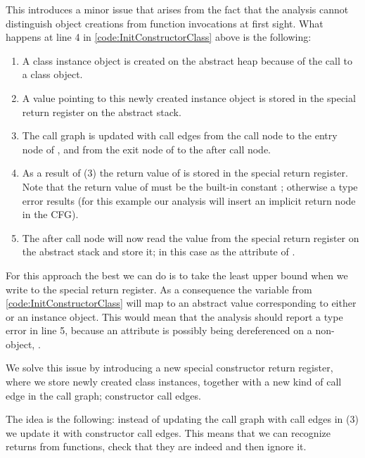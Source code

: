 This introduces a minor issue that arises from the fact that the analysis cannot distinguish object creations from function invocations at first sight. What happens at line 4 in \autoref{code:InitConstructorClass} above is the following:

\begin{enumerate}
	\item A class instance object is created on the abstract heap because of the call to a class object.
	\item A value pointing to this newly created instance object is stored in the special return register on the abstract stack.
	\item The call graph is updated with call edges from the call node to the entry node of , and from the exit node of  to the after call node.
	\item As a result of (3) the return value of  is stored in the special return register. Note that the return value of  must be the built-in constant ; otherwise a type error results (for this example our analysis will insert an implicit return  node in the CFG).
	\item The after call node will now read the value from the special return register on the abstract stack and store it; in this case as the attribute  of .
\end{enumerate}

For this approach the best we can do is to take the least upper bound when we write to the special return register. As a consequence the variable  from \autoref{code:InitConstructorClass} will map to an abstract value corresponding to either  or an instance object. This would mean that the analysis should report a type error in line 5, because an attribute is possibly being dereferenced on a non-object, .

We solve this issue by introducing a new special constructor return register, where we store newly created class instances, together with a new kind of call edge in the call graph; constructor call edges.

The idea is the following: instead of updating the call graph with call edges in (3) we update it with constructor call edges. This means that we can recognize returns from  functions, check that they are indeed  and then ignore it.

